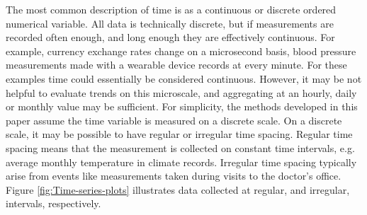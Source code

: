 \documentclass[12pt]{article}
\begin{document}
The most common description of time is as a continuous or discrete ordered numerical variable. All data is technically discrete, but if measurements are recorded often enough, and long enough they are effectively continuous. For example, currency exchange rates change on a microsecond basis, blood pressure measurements made with a wearable device records at every minute. For these examples time could essentially be considered continuous. However, it may be not helpful to evaluate trends on this microscale, and aggregating at an hourly, daily or monthly value may be sufficient. For simplicity, the methods developed in this paper assume the time variable is measured on a discrete scale.
On a discrete scale, it may be possible to have regular or irregular time spacing. Regular time spacing means that the measurement is collected on constant time intervals, e.g. average monthly temperature in climate records. Irregular time spacing typically arise from events like measurements taken during visits to the doctor's office. Figure \ref{fig:Time-series-plots} illustrates data collected at regular, and irregular, intervals, respectively.


\end{document}
